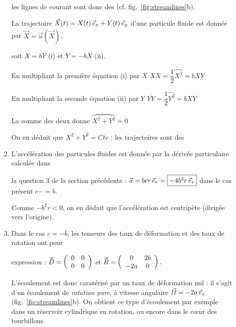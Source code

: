 \documentclass[10pt, a4paper]{article}
\renewcommand{\myvec}[1]{\vec{#1}}
\begin{document}
\begin{enumerate}
\begin{enumerate}
\medskip
les lignes de courant sont donc des
 (cf. fig.~\ref{fig:streamlines}b).

\medskip
La trajectoire $\myvec{X}(t) = X(t) \, \ex + Y(t) \, \ey$ d'une particule fluide est donnée par
$\dot{\myvec{X}} = \myvec{u}(\myvec{X})$, 

\medskip
soit $\dot{X} = b Y$ (i) et $\dot{Y} = -b X$ (ii).

En multipliant la première équation (i) par $X$ \dotfill $X\dot{X} = \dfrac{1}{2} \dot{\wideparen{X^2}} = b XY$

En multipliant la seconde équation (ii) par $Y$ \dotfill $Y\dot{Y} = \dfrac{1}{2} \dot{\wideparen{Y^2}} = b XY$

La somme des deux donne \dotfill $\dot{\wideparen{X^2+Y^2}} = 0$

\medskip
On en déduit que $X^2+Y^2 = Cte$ : les trajectoires sont des 

\medskip
\item
L'accélération des particules fluides est donnée par la dérivée particulaire calculée dans 

\medskip
la question 3 
de la section précédente :
$\myvec{a} = bc r\, \er = \fbox{$ -4b^2 r \, \er  $}$ dans le cas présent $c-=b$.

\medskip
Comme $-b^2r < 0$, on en déduit que l'accélération est centripète (dirigée vers l'origine).

\medskip
\item
Dans le cas $c=-b$, les tenseurs des taux de déformation et des taux de rotation ont pour 

\medskip
expression :
$\accentset{\Rightarrow}{D} = 	 \left (
		\begin{array}{cc}
			0 & 0 \\ 
		0 & 0 
		\end{array}
	\right )$
et
$\accentset{\Rightarrow}{R} = 	 \left (
		\begin{array}{cc}
			0 & 2b \\ 
		-2a & 0 
		\end{array}
	\right ).
$

\medskip
L'écoulement est donc caratérisé par un taux de déformation nul : il s'agit d'un écoulement de \textsl{rotation pure},
à vitesse angulaire $\myvec{\varOmega} = -2a\, \ez$ (fig.~\ref{fig:streamlines}b).
On obtient ce type d'écoulement par exemple dans un réservoir cylindrique en rotation, ou encore dans le c{\oe}ur des tourbillons.

\end{enumerate}



\end{enumerate}
\end{document}
